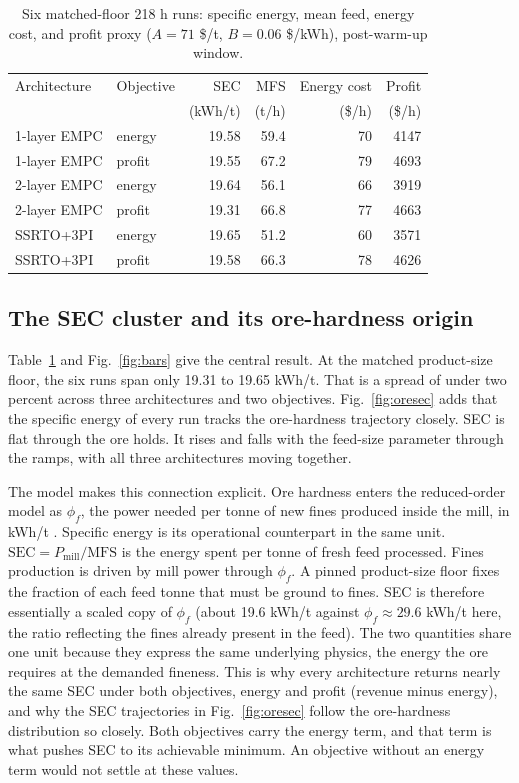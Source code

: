 \documentclass[conference]{IEEEtran}
\begin{document}
\begin{table}[t]
\centering
\caption{Six matched-floor 218 h runs: specific energy, mean feed, energy
cost, and profit proxy ($A{=}71$ \$/t, $B{=}0.06$ \$/kWh), post-warm-up
window.}
\label{tab:summary}
\begin{tabular}{llrrrr}
\toprule
Architecture & Objective & SEC & MFS & Energy cost & Profit \\
 & & (kWh/t) & (t/h) & (\$/h) & (\$/h) \\
\midrule
1-layer EMPC & energy & 19.58 & 59.4 & 70 & 4147 \\
1-layer EMPC & profit & 19.55 & 67.2 & 79 & 4693 \\
2-layer EMPC & energy & 19.64 & 56.1 & 66 & 3919 \\
2-layer EMPC & profit & 19.31 & 66.8 & 77 & 4663 \\
SSRTO+3PI    & energy & 19.65 & 51.2 & 60 & 3571 \\
SSRTO+3PI    & profit & 19.58 & 66.3 & 78 & 4626 \\
\bottomrule
\end{tabular}
\end{table}

\subsection{The SEC cluster and its ore-hardness origin}

Table~\ref{tab:summary} and Fig.~\ref{fig:bars} give the central result.
At the matched product-size floor, the six runs span only 19.31 to 19.65
kWh/t. That is a spread of under two percent across three architectures
and two objectives. Fig.~\ref{fig:oresec} adds that the specific energy
of every run tracks the ore-hardness trajectory closely. SEC is flat
through the ore holds. It rises and falls with the feed-size parameter
through the ramps, with all three architectures moving together.

The model makes this connection explicit. Ore hardness enters the
reduced-order model as $\phi_f$, the power needed per tonne of new fines
produced inside the mill, in kWh/t \cite{leroux2013}. Specific energy is
its operational counterpart in the same unit.
$\mathrm{SEC}=P_{\mathrm{mill}}/\mathrm{MFS}$ is the energy spent per
tonne of fresh feed processed. Fines production is driven by mill power
through $\phi_f$. A pinned product-size floor fixes the fraction of each
feed tonne that must be ground to fines. SEC is therefore essentially a
scaled copy of $\phi_f$ (about 19.6 kWh/t against $\phi_f \approx 29.6$
kWh/t here, the ratio reflecting the fines already present in the feed).
The two quantities share one unit because they express the same
underlying physics, the energy the ore requires at the demanded fineness.
This is why every architecture returns nearly the same SEC under both
objectives, energy and profit (revenue minus energy), and why the SEC
trajectories in Fig.~\ref{fig:oresec} follow the ore-hardness
distribution so closely. Both objectives carry the energy term, and that
term is what pushes SEC to its achievable minimum. An objective without
an energy term would not settle at these values.
\end{document}

